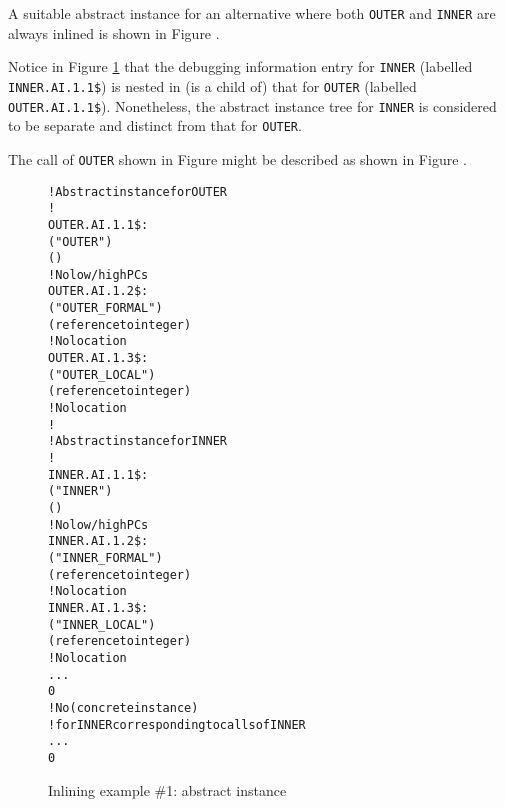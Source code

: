 A suitable abstract instance for an alternative where both
\texttt{OUTER} and \texttt{INNER} are always inlined is shown in 
Figure .

Notice in 
Figure \ref{fig:inliningexample1abstractinstance} 
that the debugging information entry for
\texttt{INNER} (labelled \texttt{INNER.AI.1.1\$}) is nested in (is a child of)
that for \texttt{OUTER} (labelled \texttt{OUTER.AI.1.1\$}). Nonetheless, the
abstract instance tree for \texttt{INNER} is considered to be separate
and distinct from that for \texttt{OUTER}.

The call of \texttt{OUTER} shown in 
Figure 
might be described as
shown in 
Figure .


\begin{figure}[p]
\begin{dwflisting}
\begin{alltt}
    ! Abstract instance for OUTER
    ! 
OUTER.AI.1.1\$:
    \DWTAGsubprogram
        \DWATname("OUTER")
        \DWATinline(\DWINLdeclaredinlined)
        ! No low/high PCs
OUTER.AI.1.2\$:
        \DWTAGformalparameter
            \DWATname("OUTER\_FORMAL")
            \DWATtype(reference to integer)
            ! No location
OUTER.AI.1.3\$:
        \DWTAGvariable
            \DWATname("OUTER\_LOCAL")
            \DWATtype(reference to integer)
            ! No location
        !
        ! Abstract instance for INNER
        !
INNER.AI.1.1\$:
        \DWTAGsubprogram
            \DWATname("INNER")
            \DWATinline(\DWINLdeclaredinlined)
            ! No low/high PCs
INNER.AI.1.2\$:
            \DWTAGformalparameter
                \DWATname("INNER\_FORMAL")
                \DWATtype(reference to integer)
                ! No location
INNER.AI.1.3\$:
            \DWTAGvariable
                \DWATname("INNER\_LOCAL")
                \DWATtype(reference to integer)
                ! No location
            ...
            0
        ! No \DWTAGinlinedsubroutine (concrete instance)
        ! for INNER corresponding to calls of INNER
        ...
        0
\end{alltt}
\end{dwflisting}
\caption{Inlining example \#1: abstract instance}
\label{fig:inliningexample1abstractinstance}
\end{figure}

